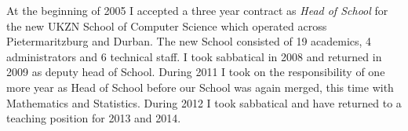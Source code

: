 \begin{description}
\begin{description}
\begin{description}
     At the beginning of 2005 I accepted a three year
     contract as {\it Head of School}
     for the new UKZN School of Computer Science which operated across  
     Pietermaritzburg and Durban. The new School consisted of 19 academics,
     4 administrators and 6 technical staff.\newline
     I took sabbatical in 2008 and returned in 2009 as 
     deputy head of School.
     During 2011 I took on the responsibility of one
     more year as Head of School before our School was again
     merged, this time with Mathematics and Statistics.
     During 2012 I took sabbatical and have returned to a
     teaching position for 2013 and 2014.
     

\end{description}
\end{description}
\end{description}
\label{f0}

